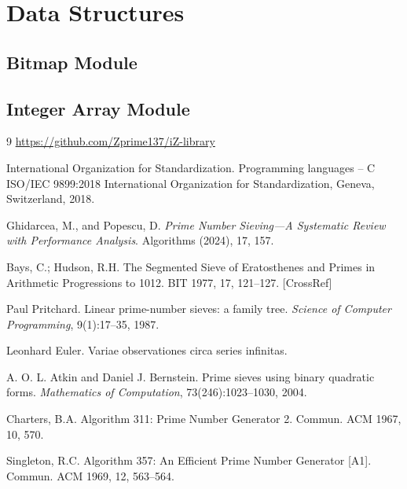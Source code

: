 \documentclass{article}
\begin{document}
\section{Data Structures}

\subsection{Bitmap Module} \label{appendix:bitmap_module}

\subsection{Integer Array Module} \label{appendix:int_array_module}

\begin{thebibliography}{9}
     \url{https://github.com/Zprime137/iZ-library}
    
     International Organization for Standardization. 
    \newblock Programming languages -- C ISO/IEC 9899:2018 International Organization for Standardization, Geneva, Switzerland, 2018.
    
    Ghidarcea, M., and Popescu, D.
    \textit{Prime Number Sieving—A Systematic Review with Performance Analysis}. Algorithms (2024), 17, 157.

    Bays, C.; Hudson, R.H. The Segmented Sieve of Eratosthenes and Primes in Arithmetic Progressions to 1012. BIT 1977, 17, 121–127.
    [CrossRef]

    Paul Pritchard.
    Linear prime-number sieves: a family tree.
    \emph{Science of Computer Programming}, 9(1):17–35, 1987.

    Leonhard Euler. Variae observationes circa series infinitas.

    A. O. L. Atkin and Daniel J. Bernstein.
    Prime sieves using binary quadratic forms.
    \emph{Mathematics of Computation}, 73(246):1023–1030, 2004.

    Charters, B.A. Algorithm 311: Prime Number Generator 2. Commun. ACM 1967, 10, 570.

    Singleton, R.C. Algorithm 357: An Efficient Prime Number Generator [A1]. Commun. ACM 1969, 12, 563–564.
\end{thebibliography}
\end{document}
